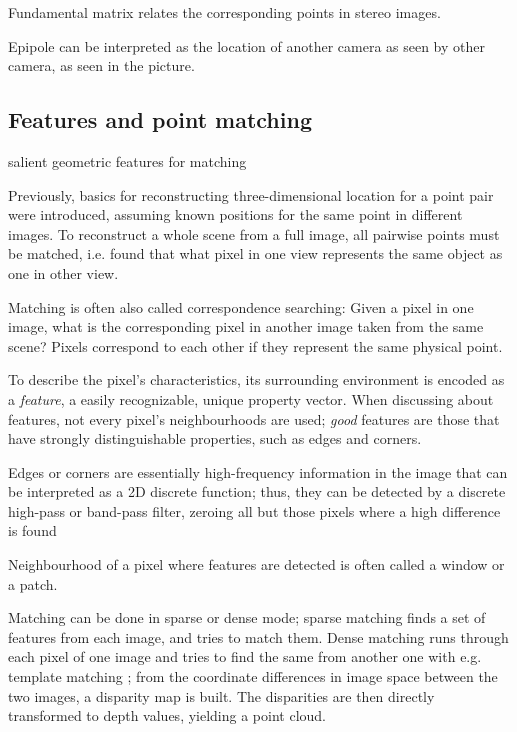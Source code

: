 Fundamental matrix relates the corresponding points in stereo images.

Epipole can be interpreted as the location of another camera as seen by other camera, as seen in the picture.


\subsection{Features and point matching} %

salient geometric features for matching

Previously, basics for reconstructing three-dimensional location for a point pair were introduced, assuming known positions for the same point in different images.
To reconstruct a whole scene from a full image, all pairwise points must be matched, i.e. found that what pixel in one view represents the same object as one in other view.

Matching is often also called correspondence searching:
Given a pixel in one image, what is the corresponding pixel in another image taken from the same scene?
Pixels correspond to each other if they represent the same physical point.


To describe the pixel's characteristics, its surrounding environment is encoded as a \textit{feature}, a easily recognizable, unique property vector.
When discussing about features, not every pixel's neighbourhoods are used; \textit{good} features are those that have strongly distinguishable properties, such as edges and corners.

Edges or corners are essentially high-frequency information in the image that can be interpreted as a 2D discrete function; thus, they can be detected by a discrete high-pass or band-pass filter, zeroing all but those pixels where a high difference is found \cite{marr1980theory}

Neighbourhood of a pixel where features are detected is often called a window or a patch.

Matching can be done in sparse or dense mode; sparse matching finds a set of features from each image, and tries to match them. Dense matching runs through each pixel of one image and tries to find the same from another one with e.g. template matching \cite{duda1973pattern}; from the coordinate differences in image space between the two images, a disparity map is built. The disparities are then directly transformed to depth values, yielding a point cloud.

